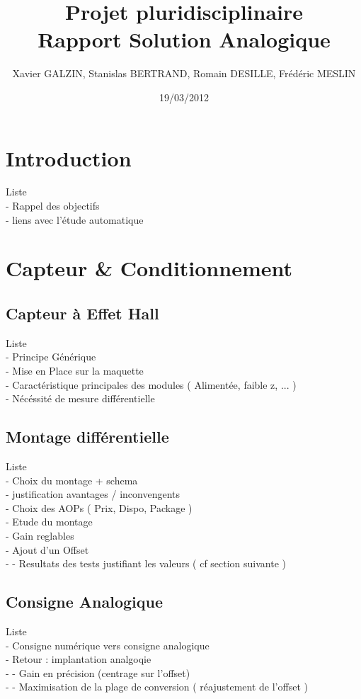 \documentclass[11pt, french]{article} %
\title{Projet pluridisciplinaire \\ Rapport Solution Analogique}
\author{Xavier GALZIN, Stanislas BERTRAND, Romain DESILLE, Frédéric MESLIN}
\date{19/03/2012}
\begin{document}
\maketitle

\pagebreak

\section*{Introduction}
Liste
\\- Rappel des objectifs
\\- liens avec l'étude automatique

\section{Capteur \& Conditionnement}
\subsection{Capteur à Effet Hall}
Liste
\\- Principe Générique
\\- Mise en Place sur la maquette
\\- Caractéristique principales des modules ( Alimentée, faible z, ... )
\\- Nécéssité de mesure différentielle
\subsection{Montage différentielle}
Liste
\\- Choix du montage + schema
\\- justification avantages / inconvengents
\\- Choix des AOPs ( Prix, Dispo, Package )
\\- Etude du montage
\\- Gain reglables
\\- Ajout d'un Offset 
\\- - Resultats des tests justifiant les valeurs ( cf section suivante )
\subsection{Consigne Analogique}
Liste
\\- Consigne numérique vers consigne analogique
\\- Retour : implantation analgoqie
\\- - Gain en précision (centrage sur l'offset)
\\- - Maximisation de la plage de conversion ( réajustement de l'offset )
\end{document}
